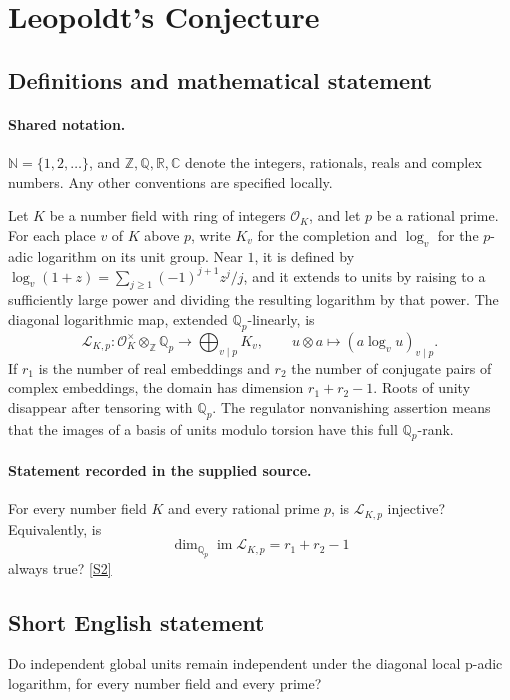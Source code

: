 \documentclass[11pt]{article}
\newcommand{\sref}[2]{\hyperlink{source:#1:#2}{[S#2]}}
\begin{document}
\section{Leopoldt's Conjecture}\label{statement}

\subsection{Definitions and mathematical statement}

\paragraph{Shared notation.}$\mathbb N=\{1,2,\ldots\}$, and $\mathbb Z,\mathbb Q,\mathbb R,\mathbb C$ denote the integers, rationals, reals and complex numbers. Any other conventions are specified locally.


Let \(K\) be a number field with ring of integers \(\mathcal O_K\),
and let \(p\) be a rational prime. For each place \(v\) of \(K\)
above \(p\), write \(K_v\) for the completion and \(\log_v\)
for the \(p\)-adic logarithm on its unit group. Near \(1\), it is
defined by \(\log_v(1+z)=\sum_{j\ge1}(-1)^{j+1}z^j/j\), and
it extends to units by raising to a sufficiently large power and
dividing the resulting logarithm by that power.
The diagonal logarithmic map, extended \(\mathbb Q_p\)-linearly, is
\[
 \mathcal L_{K,p}:\mathcal O_K^\times\otimes_{\mathbb Z}\mathbb Q_p
       \longrightarrow\bigoplus_{v\mid p}K_v,
 \qquad u\otimes a\longmapsto(a\log_v u)_{v\mid p}.
\]
If \(r_1\) is the number of real embeddings and \(r_2\) the number
of conjugate pairs of complex embeddings, the domain has dimension
\(r_1+r_2-1\). Roots of unity disappear after tensoring with \(\mathbb Q_p\).
The regulator nonvanishing assertion means that the images of a
basis of units modulo torsion have this full \(\mathbb Q_p\)-rank.
\paragraph{Statement recorded in the supplied source.}
For every number field \(K\) and every rational prime \(p\),
is \(\mathcal L_{K,p}\) injective? Equivalently, is
\[
 \dim_{\mathbb Q_p}\operatorname{im}\mathcal L_{K,p}=r_1+r_2-1
\]
always true? \sref{statement}{2}
\subsection{Short English statement}
Do independent global units remain independent under the diagonal local p-adic logarithm, for every number field and every prime?
\end{document}
